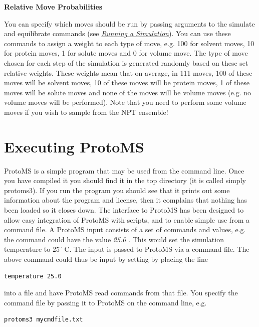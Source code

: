 \documentclass[letterpaper,10pt,english]{sphinxmanual}
\begin{document}
\textbf{Relative Move Probabilities}

You can specify which moves should be run by passing arguments to the simulate and equilibrate commands (see {\hyperref[protoms:runcmd]{\emph{Running a Simulation}}}). You can use these commands to assign a weight to each type of move, e.g. 100 for solvent moves, 10 for protein moves, 1 for solute moves and 0 for volume move. The type of move chosen for each step of the simulation is generated randomly based on these set relative weights. These weights mean that on average, in 111 moves, 100 of these moves will be solvent moves, 10 of these moves will be protein moves, 1 of these moves will be solute moves and none of the moves will be volume moves (e.g. no volume moves will be performed). Note that you need to perform some volume moves if you wish to sample from the NPT ensemble!


\chapter{Executing ProtoMS}
\label{protoms:executing-protoms}
ProtoMS is a simple program that may be used from the command line. Once you have compiled it you should find it in the top directory (it is called simply protoms3). If you run the program you should see that it prints out some information about the program and license, then it complains that nothing has been loaded so it closes down. The interface to ProtoMS has been designed to allow easy integration of ProtoMS with scripts, and to enable simple use from a command file. A ProtoMS input consists of a set of commands and values, e.g. the command  could have the value \emph{25.0} . This would set the simulation temperature to \(25^\circ\) C. The input is passed to ProtoMS via a command file. The above command could thus be input by setting by placing the line

\begin{Verbatim}[commandchars=\\\{\}]
temperature 25.0
\end{Verbatim}

into a file and have ProtoMS read commands from that file. You specify the command file by passing it to ProtoMS on the command line, e.g.

\begin{Verbatim}[commandchars=\\\{\}]
protoms3 mycmdfile.txt
\end{Verbatim}
\end{document}
